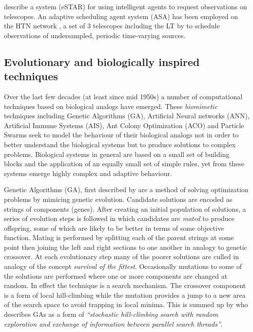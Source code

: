 \citet{allan06estar} describe a system (eSTAR) for using intelligent agents to request observations on telescopes. An adaptive scheduling agent system (ASA) has been employed on the HTN network \citep{naylor06hetero}, a set of 3 telescopes including the LT by \citet{saunders06optimal, saunders08autonomous} to schedule observations of undersampled, periodic time-varying sources.

%
%
\subsection{Evolutionary and biologically inspired techniques}
\label{sub:review_bio}
Over the last few decades (at least since mid 1950s) a number of computational techniques based on biological analogs have emerged. These \emph{biomimetic} techniques including Genetic Algorithms (GA), Artificial Neural networks (ANN), Artificial Immune Systems (AIS), Ant Colony Optimization (ACO) and Particle Swarms seek to model the behaviour of their biological analogs not in order to better understand the biological systems but to produce solutions to complex problems. Biological systems in general are based on a small set of building blocks and the application of an equally small set of simple rules, yet from these systems emerge highly complex and adaptive behaviour. 

Genetic Algorithms (GA), first described by \citet{fraser57simulation} are a method of solving optimization problems by mimicing genetic evolution. Candidate solutions are encoded as strings of components (genes). After creating an initial population of solutions, a series of evolution steps is followed in which candidates are \emph{mated} to produce offspring, some of which are likely to be better in terms of some objective function. Mating is performed by splitting each of the parent strings at some point then joining the left and right sections to one another in analogy to genetic crossover. At each evolutionary step many of the poorer solutions are culled in analogy of the concept \emph{survival of the fittest}. Occasionally mutations to some of the solutions are performed where one or more components are changed at random. In effect the technique is a search mechanism. The crossover component is a form of local hill-climbing while the mutation provides a jump to a new area of the search space to avoid trapping in local minima. This is summed up by \citet{russel03artificial} who describes GAs as a form of \emph{``stochastic hill-climbing search with random exploration and exchange of information between parallel search threads''}.

